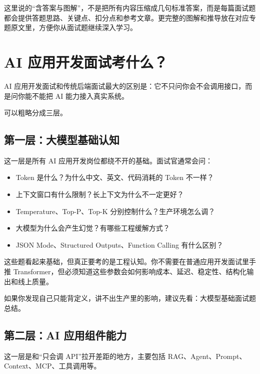 \documentclass[9pt,a4paper,twocolumn]{ctexart}
\begin{document}
这里说的“含答案与图解”，不是把所有内容压缩成几句标准答案，而是每篇面试题都会提供答题思路、关键点、扣分点和参考文章。更完整的图解和推导放在对应专题原文里，方便你从面试题继续深入学习。



\section*{AI 应用开发面试考什么？}


AI 应用开发面试和传统后端面试最大的区别是：它不只问你会不会调用接口，而是问你能不能把 AI 能力接入真实系统。



可以粗略分成三层。



\subsection*{第一层：大模型基础认知}


这一层是所有 AI 应用开发岗位都绕不开的基础。面试官通常会问：


\begin{itemize}[itemsep=1pt, topsep=2pt]
  \item Token 是什么？为什么中文、英文、代码消耗的 Token 不一样？
  \item 上下文窗口有什么限制？长上下文为什么不一定更好？
  \item Temperature、Top-P、Top-K 分别控制什么？生产环境怎么调？
  \item 大模型为什么会产生幻觉？有哪些工程缓解方式？
  \item JSON Mode、Structured Outputs、Function Calling 有什么区别？
\end{itemize}


这些题看起来基础，但真正要考的是工程认知。你不需要在普通应用开发面试里手推 Transformer，但必须知道这些参数会如何影响成本、延迟、稳定性、结构化输出和线上质量。



如果你发现自己只能背定义，讲不出生产里的影响，建议先看：大模型基础面试题总结。



\subsection*{第二层：AI 应用组件能力}


这一层是和“只会调 API”拉开差距的地方，主要包括 RAG、Agent、Prompt、Context、MCP、工具调用等。
\end{document}
